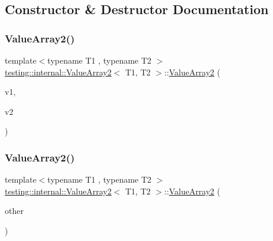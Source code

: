 \subsection{Constructor \& Destructor Documentation}
\mbox{\label{classtesting_1_1internal_1_1_value_array2_af641714b9a06929e4dcabe8854d0da1c}} 
\subsubsection{\texorpdfstring{ValueArray2()}{ValueArray2()}\hspace{0.1cm}{\footnotesize\ttfamily [1/2]}}
{\footnotesize\ttfamily template$<$typename T1 , typename T2 $>$ \\
\mbox{\hyperlink{classtesting_1_1internal_1_1_value_array2}{testing\+::internal\+::\+Value\+Array2}}$<$ T1, T2 $>$\+::\mbox{\hyperlink{classtesting_1_1internal_1_1_value_array2}{Value\+Array2}} (\begin{DoxyParamCaption}\item[{T1}]{v1,  }\item[{T2}]{v2 }\end{DoxyParamCaption})\hspace{0.3cm}{\ttfamily [inline]}}

\mbox{\label{classtesting_1_1internal_1_1_value_array2_ac0da580bf4f38494da741c7140a7927d}} 
\subsubsection{\texorpdfstring{ValueArray2()}{ValueArray2()}\hspace{0.1cm}{\footnotesize\ttfamily [2/2]}}
{\footnotesize\ttfamily template$<$typename T1 , typename T2 $>$ \\
\mbox{\hyperlink{classtesting_1_1internal_1_1_value_array2}{testing\+::internal\+::\+Value\+Array2}}$<$ T1, T2 $>$\+::\mbox{\hyperlink{classtesting_1_1internal_1_1_value_array2}{Value\+Array2}} (\begin{DoxyParamCaption}\item[{const \mbox{\hyperlink{classtesting_1_1internal_1_1_value_array2}{Value\+Array2}}$<$ T1, T2 $>$ \&}]{other }\end{DoxyParamCaption})\hspace{0.3cm}{\ttfamily [inline]}}




